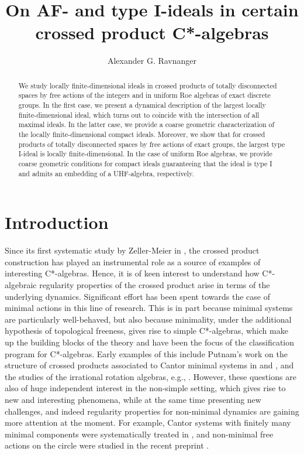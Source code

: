 \documentclass[12pt, a4paper, oneside]{amsart}
\title{On AF- and type I-ideals in certain crossed product C*-algebras}
\author{Alexander G. Ravnanger}
\newcommand{\0}{\mathbf{0}}
\newcommand{\1}{\mathbf{1}}
\begin{document}
	\begin{abstract}
		We study locally finite-dimensional ideals in crossed products of totally disconnected spaces by free actions of the integers and in uniform Roe algebras of exact discrete groups. In the first case, we present a dynamical description of the largest locally finite-dimensional ideal, which turns out to coincide with the intersection of all maximal ideals. In the latter case, we provide a coarse geometric characterization of the locally finite-dimensional compact ideals. Moreover, we show that for crossed products of totally disconnected spaces by free actions of exact groups, the largest type I-ideal is locally finite-dimensional. In the case of uniform Roe algebras, we provide coarse geometric conditions for compact ideals guaranteeing that the ideal is type I and admits an embedding of a UHF-algebra, respectively.
	\end{abstract}
	
	\maketitle
	
	
	\section{Introduction}
	
	 Since its first systematic study by Zeller-Meier in \cite{zeller}, the crossed product construction has played an instrumental role as a source of examples of interesting C*-algebras. Hence, it is of keen interest to understand how C*-algebraic regularity properties of the crossed product arise in terms of the underlying dynamics. Significant effort has been spent towards the case of minimal actions in this line of research. This is in part because minimal systems are particularly well-behaved, but also because minimality, under the additional hypothesis of topological freeness, gives rise to simple C*-algebras, which make up the building blocks of the theory and have been the focus of the classification program for C*-algebras. Early examples of this include Putnam's work on the structure of crossed products associated to Cantor minimal systems in \cite{putnam} and \cite{putnam_AF}, and the studies of the irrational rotation algebras, e.g., \cite{rieffel_irr,blackadar_irr,pv_irr,elliott_irr}. However, these questions are also of huge independent interest in the non-simple setting, which gives rise to new and interesting phenomena, while at the same time presenting new challenges, and indeed regularity properties for non-minimal dynamics are gaining more attention at the moment. For example, Cantor systems with finitely many minimal components were systematically treated in \cite{bezuglyi}, and non-minimal free actions on the circle were studied in the recent preprint \cite{bell}. 
	 
\end{document}
